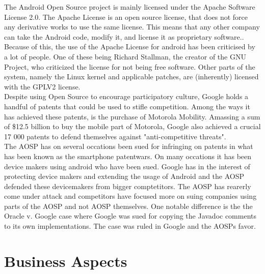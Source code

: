 \documentclass[conference]{IEEEtran}
\begin{document}
The Android Open Source project is mainly licensed under the Apache Software License 2.0. The Apache License is an open source license, that does not force any derivative works to use the same license. This means that any other company can take the Android code, modify it, and license it as proprietary software.\cite{apache-license}. 
\\Because of this, the use of the Apache License for android has been criticised by a lot of people. One of these being Richard Stallman, the creator of the GNU Project, who criticized the license for not being free software.\cite{rms-android} Other parts of the system, namely the Linux kernel and applicable patches, are (inherently) licensed with the GPLV2 license.\cite{gplv2}\cite{android-licenses} 
\\Despite using Open Source to encourage participatory culture, Google holds a handful of patents that could be used to stifle competition.\cite{google-slide-unlock}\cite{google-radial-menu} Among the ways it has achieved these patents, is the purchase of Motorola Mobility. Amassing a sum of \$12.5 billion to buy the mobile part of Motorola, Google also achieved a crucial 17 000 patents to defend themselves against "anti-competitive threats".\cite{Goggin}
\\The AOSP has on several occations been sued for infringing on patents in what has been known as the smartphone patentwars. On many occations it has been device makers using android who have been sued.\cite{android-vApple} Google has in the interest of protecting device makers and extending the usage of Android and the AOSP defended these devicemakers from bigger comptetitors.\cite{google-helps} The AOSP has rearerly come under attack and competitors have focused more on suing companies using parts of the AOSP and not AOSP themselves. One notable difference is the the Oracle v. Google case where Google was sued for copying the Javadoc comments to its own implementations.\cite{android-v-oracle} The case was ruled in Google and the AOSPs favor.

\section{Business Aspects}
\label{financial}
\end{document}
